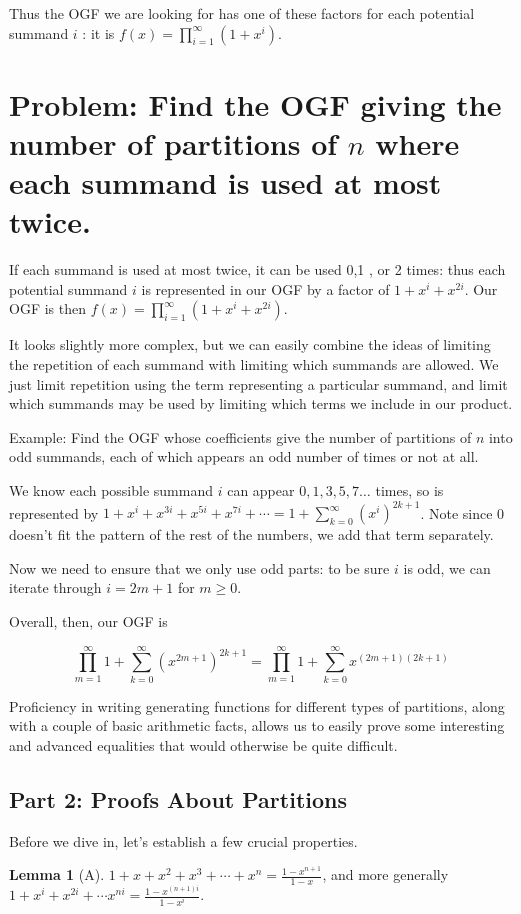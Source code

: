 \documentclass{article}
\theoremstyle{definition}
\newtheorem{lemma}{Lemma}
\begin{document}
Thus the OGF we are looking for has one of these factors for each potential summand $i$ : it is $f(x)=\prod_{i=1}^{\infty}\left(1+x^{i}\right)$.

\section*{Problem: Find the OGF giving the number of partitions of $n$ where each summand is used at most twice.}
If each summand is used at most twice, it can be used 0,1 , or 2 times: thus each potential summand $i$ is represented in our OGF by a factor of $1+x^{i}+x^{2 i}$. Our OGF is then $f(x)=\prod_{i=1}^{\infty}\left(1+x^{i}+x^{2 i}\right)$.

It looks slightly more complex, but we can easily combine the ideas of limiting the repetition of each summand with limiting which summands are allowed. We just limit repetition using the term representing a particular summand, and limit which summands may be used by limiting which terms we include in our product.

Example: Find the OGF whose coefficients give the number of partitions of $n$ into odd summands, each of which appears an odd number of times or not at all.

We know each possible summand $i$ can appear $0,1,3,5,7 \ldots$ times, so is represented by $1+x^{i}+x^{3 i}+x^{5 i}+x^{7 i}+\cdots=1+\sum_{k=0}^{\infty}\left(x^{i}\right)^{2 k+1}$. Note since 0 doesn't fit the pattern of the rest of the numbers, we add that term separately.

Now we need to ensure that we only use odd parts: to be sure $i$ is odd, we can iterate through $i=2 m+1$ for $m \geq 0$.

Overall, then, our OGF is

$$
\prod_{m=1}^{\infty} 1+\sum_{k=0}^{\infty}\left(x^{2 m+1}\right)^{2 k+1}=\prod_{m=1}^{\infty} 1+\sum_{k=0}^{\infty} x^{(2 m+1)(2 k+1)}
$$

Proficiency in writing generating functions for different types of partitions, along with a couple of basic arithmetic facts, allows us to easily prove some interesting and advanced equalities that would otherwise be quite difficult.

\subsection*{Part 2: Proofs About Partitions}
Before we dive in, let's establish a few crucial properties.\\
\begin{lemma}[A]
$1+x+x^{2}+x^{3}+\cdots+x^{n}=\frac{1-x^{n+1}}{1-x}$, and more generally $1+x^{i}+x^{2 i}+\cdots x^{n i}=\frac{1-x^{(n+1) i}}{1-x^{i}}$.
\end{lemma}
\end{document}
